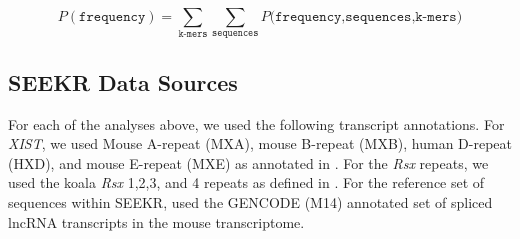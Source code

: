 $$
P(\texttt{frequency}) = \sum_{\texttt{k-mers}}{\sum_{\texttt{sequences}}{P(\texttt{frequency,sequences,k-mers)}}}
$$

\subsection{SEEKR Data Sources}
For each of the analyses above, we used the following transcript annotations. For \emph{XIST}, we used Mouse A-repeat (MXA), mouse B-repeat (MXB), human D-repeat (HXD), and mouse E-repeat (MXE) as annotated in \cite{Brockdorff10TheNucleus.}. For the \emph{Rsx} repeats, we used the koala \emph{Rsx} 1,2,3, and 4 repeats as defined in \cite{Sprague2019NonlinearDomains}. For the reference set of sequences within SEEKR, used the GENCODE (M14) annotated set of spliced lncRNA transcripts in the mouse transcriptome. 


\begin{singlespace}
\printbibliography
\end{singlespace}